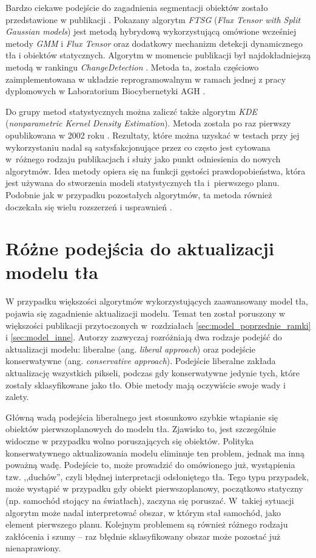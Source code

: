 Bardzo ciekawe podejście do zagadnienia segmentacji obiektów zostało przedstawione w publikacji \cite{wang_14}. 
Pokazany algorytm \textit{FTSG} (\textit{Flux Tensor with Split Gaussian models}) jest metodą hybrydową wykorzystującą omówione wcześniej metody \textit{GMM} i \textit{Flux Tensor} oraz dodatkowy mechanizm detekcji dynamicznego tła i obiektów statycznych. 
Algorytm w momencie publikacji był najdokładniejszą metodą w rankingu \textit{ChangeDetection} \cite{change_detection_web}. 
Metoda ta, została częściowo zaimplementowana w układzie reprogramowalnym w ramach jednej z pracy dyplomowych w Laboratorium Biocybernetyki AGH \cite{janus_15}.

Do grupy metod statystycznych można zaliczć także algorytm \textit{KDE} (\textit{nonparametric Kernel Density Estimation}). 
Metoda została po raz pierwszy opublikowana w 2002 roku \cite{elgammal_02}. 
Rezultaty, które można uzyskać w testach przy jej wykorzystaniu nadal są satysfakcjonujące przez co często jest cytowana w~różnego rodzaju publikacjach i służy jako punkt odniesienia do nowych algorytmów. 
Idea metody opiera się na funkcji gęstości prawdopobieństwa, która jest używana do stworzenia modeli statystycznych tła i~pierwszego planu. 
Podobnie jak w przypadku pozostałych algorytmów, ta metoda również doczekała się wielu rozszerzeń i usprawnień \cite{nonaka_12}.

\section{Różne podejścia do aktualizacji modelu tła}
\label{sec:model_tla_aktualizacja}

W przypadku większości algorytmów wykorzystujących zaawansowany model tła, pojawia się zagadnienie aktualizacji modelu. 
Temat ten został poruszony w większości publikacji przytoczonych w~rozdziałach \ref{sec:model_poprzednie_ramki} i \ref{sec:model_inne}.
Autorzy zazwyczaj rozróżniają dwa rodzaje podejść do aktualizacji modelu: liberalne (ang. \textit{liberal approach}) oraz podejście konserwatywne (ang. \textit{conservative approach}). 
Podejście liberalne zakłada aktualizację wszystkich pikseli, podczas gdy konserwatywne jedynie tych, które zostały sklasyfikowane jako tło. 
Obie metody mają oczywiście swoje wady i zalety.

Główną wadą podejścia liberalnego jest stosunkowo szybkie wtapianie się obiektów pierwszoplanowych do modelu tła. 
Zjawisko to, jest szczególnie widoczne w przypadku wolno poruszających się obiektów. 
Polityka konserwatywnego aktualizowania modelu eliminuje ten problem, jednak ma inną poważną wadę. 
Podejście to, może prowadzić do omówionego już, wystąpienia tzw. ,,duchów'', czyli błędnej interpretacji odsłoniętego tła. 
Tego typu przypadek, może wystąpić w przypadku gdy obiekt pierwszoplanowy, początkowo statyczny (np. samochód stojący na światłach), zaczyna się poruszać. 
W~takiej sytuacji algorytm może nadal interpretować obszar, w którym stał samochód, jako element pierwszego planu. 
Kolejnym problemem są również różnego rodzaju zakłócenia i szumy -- raz błędnie sklasyfikowany obszar może pozostać już nienaprawiony.


